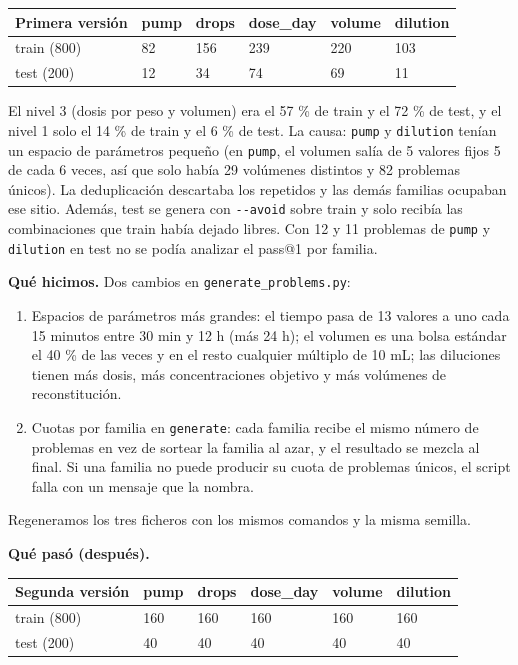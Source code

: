{\def\LTcaptype{none} %
\footnotesize\setlength{\tabcolsep}{3pt}
\begin{longtable}[]{@{}llllll@{}}
\toprule\noalign{}
Primera versión & pump & drops & dose\_\allowbreak{}day & volume & dilution \\
\midrule\noalign{}
\endhead
\bottomrule\noalign{}
\endlastfoot
train (800) & 82 & 156 & 239 & 220 & 103 \\
test (200) & 12 & 34 & 74 & 69 & 11 \\
\end{longtable}
}

El nivel 3 (dosis por peso y volumen) era el 57 \% de train y el 72 \% de test, y el nivel 1 solo
el 14 \% de train y el 6 \% de test. La causa: \texttt{pump} y \texttt{dilution} tenían un espacio de
parámetros pequeño (en \texttt{pump}, el volumen salía de 5 valores fijos 5 de cada 6 veces, así que
solo había 29 volúmenes distintos y 82 problemas únicos). La deduplicación descartaba los
repetidos y las demás familias ocupaban ese sitio. Además, test se genera con \texttt{-\/\allowbreak{}-avoid} sobre
train y solo recibía las combinaciones que train había dejado libres. Con 12 y 11 problemas de
\texttt{pump} y \texttt{dilution} en test no se podía analizar el pass@1 por familia.

\textbf{Qué hicimos.} Dos cambios en \texttt{generate\_\allowbreak{}problems.py}:

\begin{enumerate}
\tightlist
\item
  Espacios de parámetros más grandes: el tiempo pasa de 13 valores a uno cada 15 minutos
  entre 30 min y 12 h (más 24 h); el volumen es una bolsa estándar el 40 \% de las veces y en
  el resto cualquier múltiplo de 10 mL; las diluciones tienen más dosis, más concentraciones
  objetivo y más volúmenes de reconstitución.
\item
  Cuotas por familia en \texttt{generate}: cada familia recibe el mismo número de problemas en vez de
  sortear la familia al azar, y el resultado se mezcla al final. Si una familia no puede
  producir su cuota de problemas únicos, el script falla con un mensaje que la nombra.
\end{enumerate}

Regeneramos los tres ficheros con los mismos comandos y la misma semilla.

\textbf{Qué pasó (después).}

{\def\LTcaptype{none} %
\footnotesize\setlength{\tabcolsep}{3pt}
\begin{longtable}[]{@{}llllll@{}}
\toprule\noalign{}
Segunda versión & pump & drops & dose\_\allowbreak{}day & volume & dilution \\
\midrule\noalign{}
\endhead
\bottomrule\noalign{}
\endlastfoot
train (800) & 160 & 160 & 160 & 160 & 160 \\
test (200) & 40 & 40 & 40 & 40 & 40 \\
\end{longtable}
}


